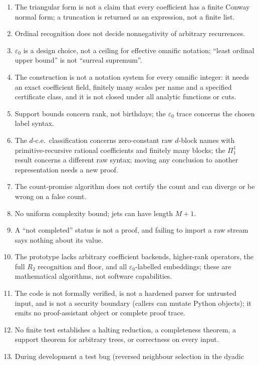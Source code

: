 \documentclass[11pt,oneside]{article}
\numberwithin{equation}{section}
\theoremstyle{definition}
\theoremstyle{remark}
\begin{document}
\begin{enumerate}[leftmargin=*,widest=00,label=08.\arabic*]
differential-equation solvers; a zero test, a solution convention and terminating
coefficient algorithms remain hypotheses.
\item The triangular form is not a claim that every coefficient has a finite
Conway normal form; a truncation is returned as an expression, not a finite list.
\item Ordinal recognition does not decide nonnegativity of arbitrary recurrences.
\item $\varepsilon_0$ is a design choice, not a ceiling for effective omnific
notation; ``least ordinal upper bound'' is not ``surreal supremum''.
\item The construction is not a notation system for every omnific integer: it
needs an exact coefficient field, finitely many scales per name and a specified
certificate class, and it is not closed under all analytic functions or cuts.
\item Support bounds concern rank, not birthdays; the $\varepsilon_0$ trace
concerns the chosen label syntax.
\item The $d$-c.e.\ classification concerns zero-constant raw $d$-block names with
primitive-recursive rational coefficients and finitely many blocks; the $\Pi^1_1$
result concerns a different raw syntax; moving any conclusion to another
representation needs a new proof.
\item The count-promise algorithm does not certify the count and can diverge or be
wrong on a false count.
\item No uniform complexity bound; jets can have length $M+1$.
\item A ``not completed'' status is not a proof, and failing to import a raw stream
says nothing about its value.
\item The prototype lacks arbitrary coefficient backends, higher-rank operators, the
full $R_2$ recognition and floor, and all $\varepsilon_0$-labelled embeddings; these
are mathematical algorithms, not software capabilities.
\item The code is not formally verified, is not a hardened parser for untrusted
input, and is not a security boundary (callers can mutate Python objects); it emits
no proof-assistant object or complete proof trace.
\item No finite test establishes a halting reduction, a completeness theorem, a
support theorem for arbitrary trees, or correctness on every input.
\item During development a test bug (reversed neighbour selection in the dyadic

\end{enumerate}
\end{document}
